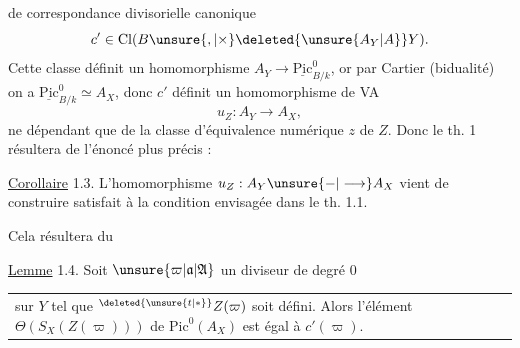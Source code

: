 de correspondance divisorielle canonique
\[
c'\in\mathrm{Cl}(B\unsure{,|\times}\deleted{\unsure{A_Y|A}}Y).
\]
 Cette classe définit un homomorphisme  $A_Y\longrightarrow\underline{\mathrm{Pic}}^0_{B/k}$, or par Cartier (bidualité) on a  $\underline{\mathrm{Pic}}^0_{B/k}\simeq A_X$, donc $c'$ définit un  homomorphisme de VA
\[
u_Z:A_Y\longrightarrow A_X,
\]
ne dépendant que de la classe d'équivalence numérique $z$ de $Z$. Donc le th. 1 résultera de l'énoncé plus précis :

\uline{Corollaire} 1.3. L'homomorphisme $u_Z:A_Y\unsure{-|\longrightarrow} A_X$  vient de construire satisfait à la condition envisagée dans le th. 1.1. 

Cela résultera du

\uline{Lemme} 1.4. Soit $\unsure{\varpi|\mathfrak{a}|\mathfrak{A}}$ un diviseur de degré $0$
\par\noindent\begin{tabular}{@{}|p{.92\linewidth}@{}}
sur $Y$ tel que $ {}^{\deleted{\unsure{t|*}}}Z(\varpi)$ soit défini. Alors l'élément $\Theta(S_X(Z(\varpi)))$ de $\mathrm{Pic}^0(A_X)$ est égal à $c'(\varpi)$.
\end{tabular}
